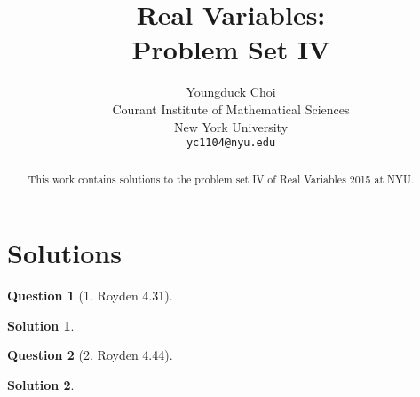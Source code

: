 \documentclass{article} %
\title{Real Variables: \\
Problem Set IV}
\author{
Youngduck Choi \\
Courant Institute of Mathematical Sciences \\
New York University \\
\texttt{yc1104@nyu.edu} \\
}
\theoremstyle{quest}
\newtheorem*{question}{Question}
\newtheorem*{solution}{Solution}
\begin{document}
\maketitle

\begin{abstract}
This work contains solutions to the problem set IV of Real Variables 2015 at NYU.
\end{abstract}

\section{Solutions}

\bigskip

\begin{question}[1. Royden 4.31]
\end{question}
\begin{solution}
\end{solution}

\bigskip

\begin{question}[2. Royden 4.44]
\end{question}
\begin{solution}

\end{solution}

\bigskip
\end{document}
